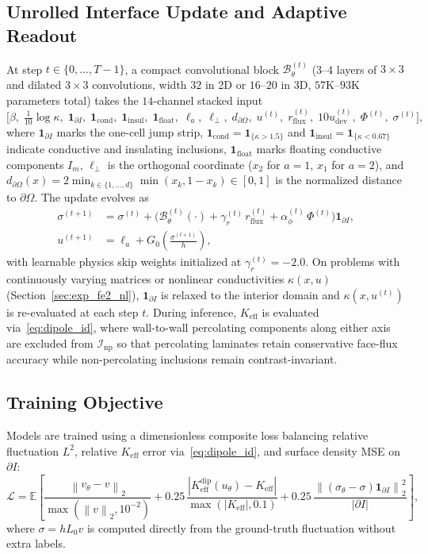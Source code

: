 \documentclass[preprint,11pt]{elsarticle}
\newcommand{\Keff}{K_{\mathrm{eff}}}
\newcommand{\norm}[1]{\left\lVert #1 \right\rVert}
\newcommand{\abs}[1]{\left\lvert #1 \right\rvert}
\begin{document}
\subsection{Unrolled Interface Update and Adaptive Readout}
At step $t \in \{0,\dots,T-1\}$, a compact convolutional block $\mathcal{B}_\theta^{(t)}$ (3--4 layers of $3\times 3$ and dilated $3\times 3$ convolutions, width $32$ in 2D or $16$--$20$ in 3D, $57\mathrm{K}$--$93\mathrm{K}$ parameters total) takes the $14$-channel stacked input
\[
  \Big[\beta,\; \tfrac{1}{10}\log\kappa,\; \mathbf{1}_{\partial I},\; \mathbf{1}_{\mathrm{cond}},\; \mathbf{1}_{\mathrm{insul}},\; \mathbf{1}_{\mathrm{float}},\; \ell_a,\; \ell_\perp,\; d_{\partial\Omega},\; u^{(t)},\; r_{\mathrm{flux}}^{(t)},\; 10 u_{\mathrm{dev}}^{(t)},\; \Phi^{(t)},\; \sigma^{(t)}\Big],
\]
where $\mathbf{1}_{\partial I}$ marks the one-cell jump strip, $\mathbf{1}_{\mathrm{cond}} = \mathbf{1}_{\{\kappa > 1.5\}}$ and $\mathbf{1}_{\mathrm{insul}} = \mathbf{1}_{\{\kappa < 0.67\}}$ indicate conductive and insulating inclusions, $\mathbf{1}_{\mathrm{float}}$ marks floating conductive components $I_m$, $\ell_\perp$ is the orthogonal coordinate ($x_2$ for $a=1$, $x_1$ for $a=2$), and $d_{\partial\Omega}(x) = 2\min_{k\in\{1,\dots,d\}}\min(x_k, 1-x_k) \in [0, 1]$ is the normalized distance to $\partial\Omega$. The update evolves as
\begin{align}\label{eq:sigma_upd}
  \sigma^{(t+1)} &= \sigma^{(t)} + \Big(\mathcal{B}_\theta^{(t)}(\cdot) + \gamma_r^{(t)}\, r_{\mathrm{flux}}^{(t)} + \alpha_\phi^{(t)}\, \Phi^{(t)}\Big)\mathbf{1}_{\partial I}, \nonumber\\
  u^{(t+1)} &= \ell_a + G_0\!\left(\frac{\sigma^{(t+1)}}{h}\right),
\end{align}
with learnable physics skip weights initialized at $\gamma_r^{(t)} = -2.0$. On problems with continuously varying matrices or nonlinear conductivities $\kappa(x,u)$ (Section~\ref{sec:exp_fe2_nl}), $\mathbf{1}_{\partial I}$ is relaxed to the interior domain and $\kappa(x, u^{(t)})$ is re-evaluated at each step $t$. During inference, $\Keff$ is evaluated via~\eqref{eq:dipole_id}, where wall-to-wall percolating components along either axis are excluded from $\mathcal{I}_{\mathrm{np}}$ so that percolating laminates retain conservative face-flux accuracy while non-percolating inclusions remain contrast-invariant.

\subsection{Training Objective}
Models are trained using a dimensionless composite loss balancing relative fluctuation $L^2$, relative $\Keff$ error via~\eqref{eq:dipole_id}, and surface density MSE on $\partial I$:
\begin{equation}
  \mathcal{L} = \mathbb{E}\!\left[\frac{\norm{v_\theta - v}_{2}}{\max(\norm{v}_{2}, 10^{-2})} + 0.25\,\frac{\abs{\Keff^{\mathrm{dip}}(u_\theta) - \Keff}}{\max(\abs{\Keff}, 0.1)} + 0.25\,\frac{\norm{(\sigma_\theta - \sigma)\mathbf{1}_{\partial I}}_2^2}{\abs{\partial I}}\right],
\end{equation}
where $\sigma = h L_0 v$ is computed directly from the ground-truth fluctuation without extra labels.
\end{document}
